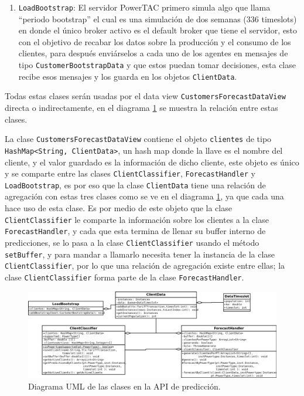 \begin{enumerate}
	\item \texttt{LoadBootstrap}: El servidor PowerTAC primero simula algo que llama ``periodo bootstrap'' el cual es una simulación de dos semanas (336 timeslots) en donde el único broker activo es el default broker que tiene el servidor, esto con el objetivo de recabar los datos sobre la producción y el consumo de los clientes, para después enviárselos a cada uno de los agentes en mensajes de tipo \texttt{CustomerBootstrapData} y que estos puedan tomar decisiones, esta clase recibe esos mensajes y los guarda en los objetos \texttt{ClientData}.
\end{enumerate}

Todas estas clases serán usadas por el data view
\texttt{CustomersForecastDataView} directa o indirectamente,
 en el diagrama \ref{fig:clasesAPI} se muestra la relación entre estas clases.

La clase \texttt{CustomersForecastDataView} contiene el objeto \texttt{clientes} de tipo \\ \texttt{HashMap<String, ClientData>}, un hash map donde la llave es el nombre del cliente, y el valor guardado es la información de dicho cliente, este objeto es único y se comparte entre las clases \texttt{ClientClassifier}, \texttt{ForecastHandler} y \texttt{LoadBootstrap}, es por eso que la clase \texttt{ClientData} tiene una relación de agregación con estas tres clases como se ve en el diagrama \ref{fig:clasesAPI}, ya que cada una hace uso de esta clase. Es por medio de este objeto que la clase \texttt{ClientClassifier} le comparte la información sobre los clientes a la clase \texttt{ForecastHandler}, y cada que esta termina de llenar su buffer interno de predicciones, se lo pasa a la clase \texttt{ClientClassifier} usando el método \texttt{setBuffer}, y para mandar a llamarlo necesita tener la instancia de la clase \texttt{ClientClassifier}, por lo que una relación de agregación existe entre ellas; la clase \texttt{ClientClassifier} forma parte de la clase \texttt{ForecastHandler}.


\begin{figure}[ht]%
	\centering
	\includegraphics[width=15cm]{img/DiagramaUMLClasesAPI.png}
	\caption{Diagrama UML de las clases en la API de predicción.}
	\label{fig:clasesAPI}
\end{figure}


